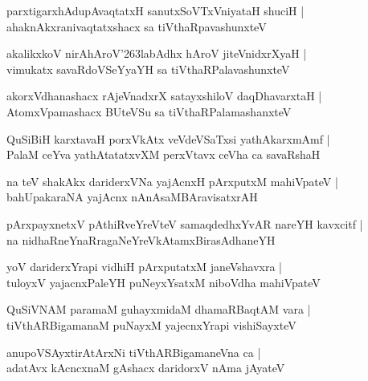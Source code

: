 \documentclass[twoside,12pt,openright]{book}
\def\S{\char'263}
\newcounter{shloka}[chapter]
\begin{document}
\begin{shloka}
parxtigarxhAdupAvaqtatxH sanutxSoVTxVniyataH shuciH |\\
ahaknAkxranivaqtatxshacx sa tiVthaRpavashunxteV 
\end{shloka}

\begin{shloka}
akalikxkoV nirAhAroV\S labAdhx hAroV jiteVnidxrXyaH |\\
vimukatx savaRdoVSeYyaYH sa tiVthaRPalavashunxteV
\end{shloka}

\begin{shloka}
akorxVdhanashacx rAjeVnadxrX satayxshiloV daqDhavarxtaH |\\
AtomxVpamashacx BUteVSu sa tiVthaRPalamashanxteV 
\end{shloka}

\begin{shloka}
QuSiBiH karxtavaH porxVkAtx veVdeVSaTxsi yathAkarxmAmf |\\
PalaM ceYva yathAtatatxvXM perxVtavx ceVha ca savaRshaH
\end{shloka}

\begin{shloka}
na teV shakAkx dariderxVNa yajAcnxH pArxputxM mahiVpateV |\\
bahUpakaraNA yajAcnx nAnAsaMBAravisatxrAH
\end{shloka}

\begin{shloka}
pArxpayxnetxV pAthiRveYreVteV samaqdedhxYvAR nareYH kavxcitf |\\
na nidhaRneYnaRragaNeYreVkAtamxBirasAdhaneYH
\end{shloka}

\begin{shloka}
yoV dariderxYrapi vidhiH pArxputatxM janeVshavxra |\\
tuloyxV yajacnxPaleYH puNeyxYsatxM niboVdha mahiVpateV
\end{shloka}

\begin{shloka}
QuSiVNAM paramaM guhayxmidaM dhamaRBaqtAM vara |\\
tiVthARBigamanaM puNayxM yajecnxYrapi vishiSayxteV
\end{shloka}

\begin{shloka}
anupoVSAyxtirAtArxNi tiVthARBigamaneVna ca |\\
adatAvx kAcncxnaM gAshacx daridorxV nAma jAyateV 
\end{shloka}
\end{document}
